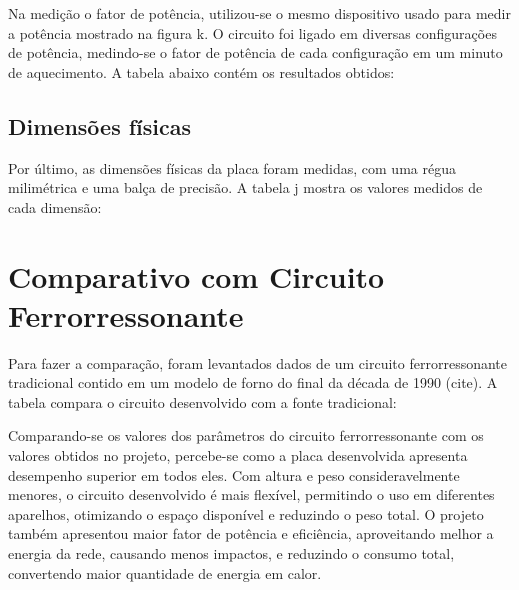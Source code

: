 Na medição o fator de potência,  utilizou-se o mesmo dispositivo usado para medir a potência mostrado na figura k. O circuito foi ligado em diversas configurações de potência, medindo-se o fator de potência de cada configuração em um minuto de aquecimento. A tabela abaixo contém os resultados obtidos:

\subsection{Dimensões físicas}
Por último, as dimensões físicas da placa foram medidas, com uma régua milimétrica e uma balça de precisão. A tabela j mostra os valores medidos de cada dimensão:

\section{Comparativo com Circuito Ferrorressonante}

Para fazer a comparação, foram levantados dados de um circuito ferrorressonante tradicional contido em um modelo de forno do final da década de 1990 (cite).  A tabela compara  o circuito desenvolvido com a fonte tradicional:


 Comparando-se os valores dos parâmetros do circuito ferrorressonante com os valores obtidos no projeto, percebe-se como a placa desenvolvida apresenta desempenho superior em todos eles. Com altura e peso consideravelmente menores, o circuito desenvolvido é mais flexível, permitindo o uso em diferentes aparelhos, otimizando o espaço disponível e reduzindo o peso total. O projeto também apresentou maior fator de potência e eficiência, aproveitando melhor a energia da rede, causando menos impactos, e reduzindo o consumo total, convertendo maior quantidade de energia em calor.
